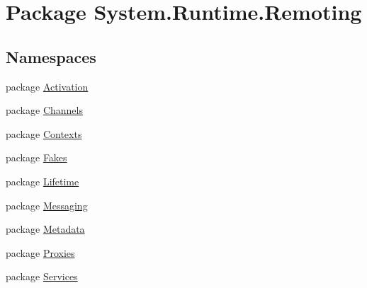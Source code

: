 \hypertarget{namespace_system_1_1_runtime_1_1_remoting}{\section{Package System.\-Runtime.\-Remoting}
\label{namespace_system_1_1_runtime_1_1_remoting}
}
\subsection*{Namespaces}
\begin{DoxyCompactItemize}
\item 
package \hyperlink{namespace_system_1_1_runtime_1_1_remoting_1_1_activation}{Activation}
\item 
package \hyperlink{namespace_system_1_1_runtime_1_1_remoting_1_1_channels}{Channels}
\item 
package \hyperlink{namespace_system_1_1_runtime_1_1_remoting_1_1_contexts}{Contexts}
\item 
package \hyperlink{namespace_system_1_1_runtime_1_1_remoting_1_1_fakes}{Fakes}
\item 
package \hyperlink{namespace_system_1_1_runtime_1_1_remoting_1_1_lifetime}{Lifetime}
\item 
package \hyperlink{namespace_system_1_1_runtime_1_1_remoting_1_1_messaging}{Messaging}
\item 
package \hyperlink{namespace_system_1_1_runtime_1_1_remoting_1_1_metadata}{Metadata}
\item 
package \hyperlink{namespace_system_1_1_runtime_1_1_remoting_1_1_proxies}{Proxies}
\item 
package \hyperlink{namespace_system_1_1_runtime_1_1_remoting_1_1_services}{Services}
\end{DoxyCompactItemize}
